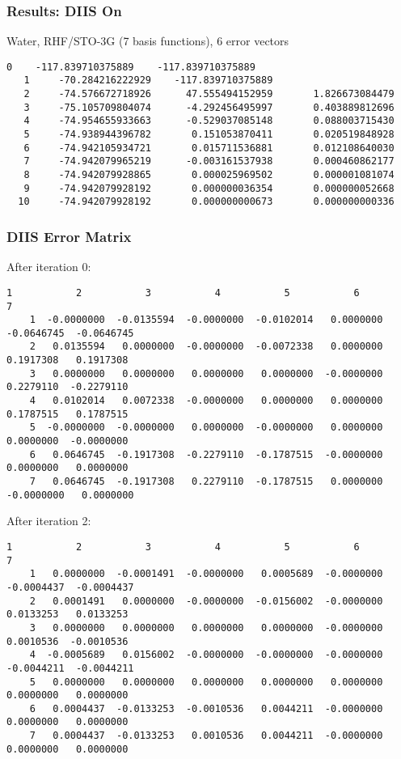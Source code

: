 \documentclass[10pt,compress,red]{beamer}
\begin{document}
\begin{frame}[fragile]
  \frametitle{Results: DIIS On}
  Water, RHF/STO-3G (7 basis functions), 6 error vectors
\begin{Verbatim}[fontsize=\tiny]
   0    -117.839710375889    -117.839710375889
   1     -70.284216222929    -117.839710375889
   2     -74.576672718926      47.555494152959       1.826673084479
   3     -75.105709804074      -4.292456495997       0.403889812696
   4     -74.954655933663      -0.529037085148       0.088003715430
   5     -74.938944396782       0.151053870411       0.020519848928
   6     -74.942105934721       0.015711536881       0.012108640030
   7     -74.942079965219      -0.003161537938       0.000460862177
   8     -74.942079928865       0.000025969502       0.000001081074
   9     -74.942079928192       0.000000036354       0.000000052668
  10     -74.942079928192       0.000000000673       0.000000000336
\end{Verbatim}
\end{frame}

\begin{frame}[fragile]
  \frametitle{DIIS Error Matrix}
After iteration 0:
\begin{Verbatim}[fontsize=\tiny]
                1           2           3           4           5           6           7
    1  -0.0000000  -0.0135594  -0.0000000  -0.0102014   0.0000000  -0.0646745  -0.0646745
    2   0.0135594   0.0000000  -0.0000000  -0.0072338   0.0000000   0.1917308   0.1917308
    3   0.0000000   0.0000000   0.0000000   0.0000000  -0.0000000   0.2279110  -0.2279110
    4   0.0102014   0.0072338  -0.0000000   0.0000000   0.0000000   0.1787515   0.1787515
    5  -0.0000000  -0.0000000   0.0000000  -0.0000000   0.0000000   0.0000000  -0.0000000
    6   0.0646745  -0.1917308  -0.2279110  -0.1787515  -0.0000000   0.0000000   0.0000000
    7   0.0646745  -0.1917308   0.2279110  -0.1787515   0.0000000  -0.0000000   0.0000000
\end{Verbatim}
After iteration 2:
\begin{Verbatim}[fontsize=\tiny]
                1           2           3           4           5           6           7
    1   0.0000000  -0.0001491  -0.0000000   0.0005689  -0.0000000  -0.0004437  -0.0004437
    2   0.0001491   0.0000000  -0.0000000  -0.0156002  -0.0000000   0.0133253   0.0133253
    3   0.0000000   0.0000000   0.0000000   0.0000000  -0.0000000   0.0010536  -0.0010536
    4  -0.0005689   0.0156002  -0.0000000  -0.0000000  -0.0000000  -0.0044211  -0.0044211
    5   0.0000000   0.0000000   0.0000000   0.0000000   0.0000000   0.0000000   0.0000000
    6   0.0004437  -0.0133253  -0.0010536   0.0044211  -0.0000000   0.0000000   0.0000000
    7   0.0004437  -0.0133253   0.0010536   0.0044211  -0.0000000   0.0000000   0.0000000
\end{Verbatim}
\end{frame}
\end{document}

